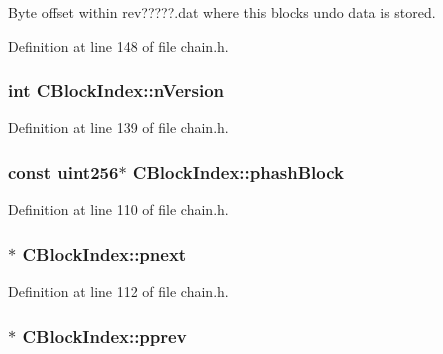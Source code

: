 Byte offset within rev?????.dat where this block\textquotesingle{}s undo data is stored. 



Definition at line 148 of file chain.\+h.

\hypertarget{class_c_block_index_a45126301a0a6e26010527a7bbfc1ef58}{}
\subsubsection[{n\+Version}]{\setlength{\rightskip}{0pt plus 5cm}int C\+Block\+Index\+::n\+Version}\label{class_c_block_index_a45126301a0a6e26010527a7bbfc1ef58}


Definition at line 139 of file chain.\+h.

\hypertarget{class_c_block_index_afac8099e03ffda463c7153ca82d37b66}{}
\subsubsection[{phash\+Block}]{\setlength{\rightskip}{0pt plus 5cm}const {\bf uint256}$\ast$ C\+Block\+Index\+::phash\+Block}\label{class_c_block_index_afac8099e03ffda463c7153ca82d37b66}


Definition at line 110 of file chain.\+h.

\hypertarget{class_c_block_index_a2f0acd342accaab731d887584b444590}{}
\subsubsection[{pnext}]{$\ast$ C\+Block\+Index\+::pnext}\label{class_c_block_index_a2f0acd342accaab731d887584b444590}


Definition at line 112 of file chain.\+h.

\hypertarget{class_c_block_index_a1ef11137155df1dd5c81491630cece39}{}
\subsubsection[{pprev}]{$\ast$ C\+Block\+Index\+::pprev}\label{class_c_block_index_a1ef11137155df1dd5c81491630cece39}


